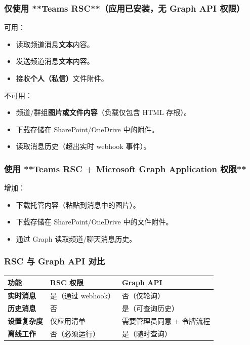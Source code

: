 \subsubsection{仅使用 **Teams RSC**（应用已安装，无 Graph API 权限）}


可用：

\begin{itemize}
  \item 读取频道消息\textbf{文本}内容。
  \item 发送频道消息\textbf{文本}内容。
  \item 接收\textbf{个人（私信）}文件附件。
\end{itemize}


不可用：

\begin{itemize}
  \item 频道/群组\textbf{图片或文件内容}（负载仅包含 HTML 存根）。
  \item 下载存储在 SharePoint/OneDrive 中的附件。
  \item 读取消息历史（超出实时 webhook 事件）。
\end{itemize}


\subsubsection{使用 **Teams RSC + Microsoft Graph Application 权限**}


增加：

\begin{itemize}
  \item 下载托管内容（粘贴到消息中的图片）。
  \item 下载存储在 SharePoint/OneDrive 中的文件附件。
  \item 通过 Graph 读取频道/聊天消息历史。
\end{itemize}


\subsubsection{RSC 与 Graph API 对比}



\begin{table}[h]
\centering
\small
\begin{tabular}{|l|l|l|}
\hline
功能 & RSC 权限 & Graph API \\
\hline
\textbf{实时消息} & 是（通过 webhook） & 否（仅轮询） \\
\hline
\textbf{历史消息} & 否 & 是（可查询历史） \\
\hline
\textbf{设置复杂度} & 仅应用清单 & 需要管理员同意 + 令牌流程 \\
\hline
\textbf{离线工作} & 否（必须运行） & 是（随时查询） \\
\hline
\end{tabular}
\end{table}




